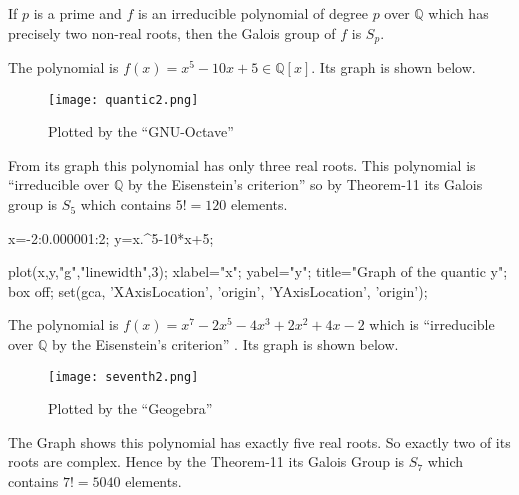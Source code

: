 \begin{theorem} \cite{hunger}
 If \(p\) is a prime and \(f\) is an irreducible polynomial of degree \(p\) over \(\mathbb{Q}\) which has precisely two non-real roots, then the Galois group of \(f\) is \(S_p\).
\end{theorem}

\begin{example}
  The polynomial is \(f(x)=x^5-10x+5 \in \mathbb{Q}[x]\). Its graph is shown below.
  \begin{figure}[h!]
    \texttt{[image: quantic2.png]}
    \caption{\footnotesize Plotted by the ``GNU-Octave''}
  \end{figure}

 From its graph this polynomial has only three real roots. This polynomial is ``irreducible over \(\mathbb{Q}\) by the Eisenstein's criterion'' \cite{hunger} so by Theorem-11 its Galois group is \(S_5\) which contains \(5!=120\) elements.
 \end{example}

  \begin{tcolorbox}[colback=gray!20, colframe=blue!30, title={\small \bfseries \textcolor{black}{GNU-Octave Code for the above plotting}}, width=15cm]
\begin{boxedverbatim}
  x=-2:0.000001:2;
  y=x.^5-10*x+5;

  plot(x,y,"g","linewidth",3);
  xlabel="x";                     yabel="y";
  title="Graph of the quantic y";
  box off;
  set(gca, 'XAxisLocation', 'origin', 'YAxisLocation', 'origin');
\end{boxedverbatim}
  \end{tcolorbox}

\vspace{5mm}

\begin{example}
  The polynomial is \(f(x)=x^7-2x^5-4x^3+2x^2+4x-2\) which is ``irreducible over \(\mathbb{Q}\) by the Eisenstein's criterion'' \cite{hunger}. Its graph is shown below.

    \begin{figure}[h!]
    \texttt{[image: seventh2.png]}
    \caption{\footnotesize Plotted by the ``Geogebra''}
  \end{figure}
The Graph shows this polynomial has exactly five real roots. So exactly two of its roots are complex. Hence by the Theorem-11 its Galois Group is \(S_7\) which contains \(7!=5040\) elements.
\end{example}

